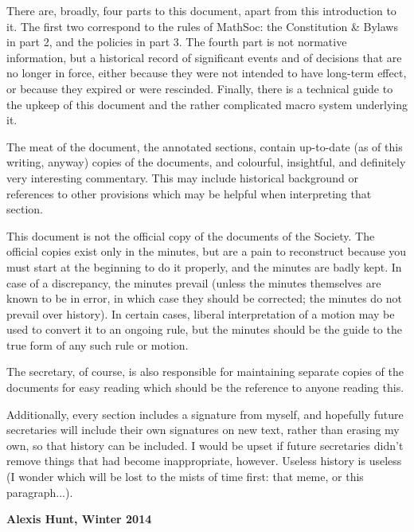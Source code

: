 There are, broadly, four parts to this document, apart from this
introduction to it. The first two correspond to the rules of MathSoc:
the Constitution \& Bylaws in part 2, and the policies in part 3. The fourth
part is not normative information, but a historical record of significant events
and of decisions that are no longer in force, either because they were not
intended to have long-term effect, or because they expired or were rescinded.
Finally, there is a technical guide to the upkeep of this document and the
rather complicated macro system underlying it.

The meat of the document, the annotated sections, contain up-to-date (as of this
writing, anyway) copies of the documents, and colourful, insightful, and
definitely very interesting commentary. This may include historical background
or references to other provisions which may be helpful when interpreting that
section.

This document is not the official copy of the documents of the Society. The
official copies exist only in the minutes, but are a pain to reconstruct because
you must start at the beginning to do it properly, and the minutes are badly
kept. In case of a discrepancy, the minutes prevail (unless the minutes
themselves are known to be in error, in which case they should be corrected; the
minutes do not prevail over history). In certain cases, liberal interpretation
of a motion may be used to convert it to an ongoing rule, but the minutes should
be the guide to the true form of any such rule or motion.

The secretary, of course, is also responsible for maintaining separate copies of
the documents for easy reading which should be the reference to anyone reading
this.

Additionally, every section includes a signature from myself, and hopefully
future secretaries will include their own signatures on new text, rather than
erasing my own, so that history can be included. I would be upset if future
secretaries didn't remove things that had become inappropriate, however. Useless
history is useless (I wonder which will be lost to the mists of time first: that
meme, or this paragraph...).

\textbf{Alexis Hunt, Winter 2014}
